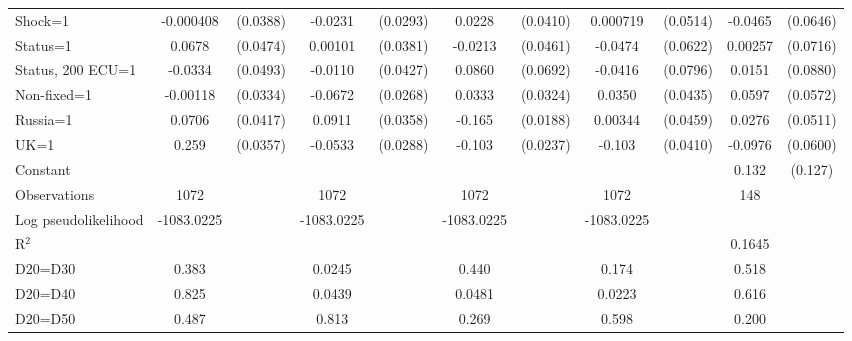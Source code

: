 \begin{tabular}{l|cccccccc|cc}
Shock=1         &-0.000408         & (0.0388)&  -0.0231         & (0.0293)&   0.0228         & (0.0410)& 0.000719         & (0.0514)&  -0.0465         & (0.0646)\\
Status=1        &   0.0678         & (0.0474)&  0.00101         & (0.0381)&  -0.0213         & (0.0461)&  -0.0474         & (0.0622)&  0.00257         & (0.0716)\\
Status, 200 ECU=1&  -0.0334         & (0.0493)&  -0.0110         & (0.0427)&   0.0860         & (0.0692)&  -0.0416         & (0.0796)&   0.0151         & (0.0880)\\
Non-fixed=1     & -0.00118         & (0.0334)&  -0.0672\sym{**} & (0.0268)&   0.0333         & (0.0324)&   0.0350         & (0.0435)&   0.0597         & (0.0572)\\
Russia=1        &   0.0706\sym{*}  & (0.0417)&   0.0911\sym{**} & (0.0358)&   -0.165\sym{***}& (0.0188)&  0.00344         & (0.0459)&   0.0276         & (0.0511)\\
UK=1            &    0.259\sym{***}& (0.0357)&  -0.0533\sym{*}  & (0.0288)&   -0.103\sym{***}& (0.0237)&   -0.103\sym{**} & (0.0410)&  -0.0976         & (0.0600)\\
Constant        &                  &         &                  &         &                  &         &                  &         &    0.132         &  (0.127)\\
\hline
Observations    &     1072         &         &     1072         &         &     1072         &         &     1072         &         &      148         &         \\
Log pseudolikelihood  & -1083.0225    &         &    -1083.0225              &         &       -1083.0225           &         &   -1083.0225        &   &  & \\ 
R$^2$      &                  &         &                  &         &                  &         &           &    & 0.1645 &  \\ 
D20=D30         &    0.383         &         &   0.0245         &         &    0.440         &         &    0.174         &         &    0.518         &         \\
D20=D40         &    0.825         &         &   0.0439         &         &   0.0481         &         &   0.0223         &         &    0.616         &         \\
D20=D50         &    0.487         &         &    0.813         &         &    0.269         &         &    0.598         &         &    0.200         &         \\

\end{tabular}

